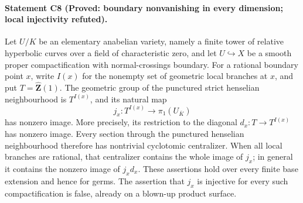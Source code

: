 \paragraph{Statement C8 (Proved: boundary nonvanishing in every dimension;
local injectivity refuted).}\label{res:C8}
Let $U/K$ be an elementary anabelian variety, namely a finite tower of
relative hyperbolic curves over a field of characteristic zero, and let
$U\hookrightarrow X$ be a smooth proper compactification with
normal-crossings boundary. For a rational boundary point $x$, write
$I(x)$ for the nonempty set of geometric local branches at $x$, and put
$T=\widehat{\mathbf Z}(1)$. The geometric group of the punctured strict
henselian neighbourhood is $T^{I(x)}$, and its natural map
\[
 j_x:T^{I(x)}\longrightarrow\pi_1(U_{\overline K})
\]
has nonzero image. More precisely, its restriction to the diagonal
$d_x:T\to T^{I(x)}$ has nonzero image. Every section through the
punctured henselian neighbourhood therefore has nontrivial cyclotomic
centralizer. When all local branches are rational, that centralizer
contains the whole image of $j_x$; in general it contains the nonzero
image of $j_xd_x$. These assertions hold over every finite base extension
and hence for germs. The assertion that $j_x$ is injective for every
such compactification is false, already on a blown-up product surface.
